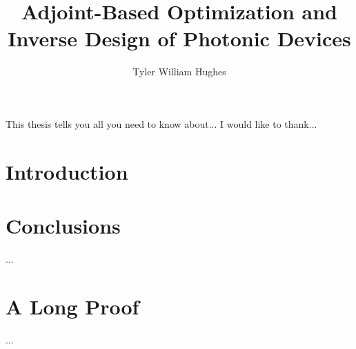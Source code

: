 \documentclass{report}
\begin{document}
\title{Adjoint-Based Optimization and Inverse Design of Photonic Devices}
\author{Tyler William Hughes}
 
\beforepreface
{}
This thesis tells you all you need to know about...
I would like to thank...
\afterpreface

\chapter{Introduction}

\chapter{Conclusions}
...
\appendix
\chapter{A Long Proof}
...


\end{document}
